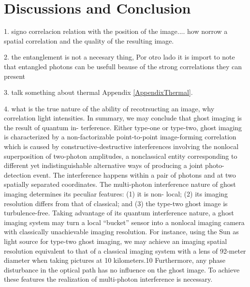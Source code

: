 
\chapter{Discussions and Conclusion} %

\label{Chapter5} %

1. signo correlacion relation with the position of the image.... how norrow a spatial correlation and the quality of the resulting image.

2. the entanglement is not a necesary thing, Por otro lado it is import to note 
that entangled photons can be usefull beause of the strong correlations they can present

3. talk something about thermal Appendix \ref{AppendixThermal}.

4. what is the true nature of the ability of recotrsucting an image, why correlation light intensities.\cite{zhong}
In summary, we may conclude that ghost imaging is the result of quantum in- terference. Either type-one or type-two, ghost imaging is characterized by a non-factorizable point-to-point image-forming correlation which is caused by constructive-destructive interferences involving the nonlocal superposition of two-photon amplitudes, a nonclassical entity corresponding to different yet indistinguishable alternative ways of producing a joint photo-detection event. The interference happens within a pair of photons and at two spatially separated coordinates. The multi-photon interference nature of ghost imaging determines its peculiar features: (1) it is non- local; (2) its imaging resolution differs from that of classical; and (3) the type-two ghost image is turbulence-free. Taking advantage of its quantum interference nature, a ghost imaging system may turn a local “bucket” sensor into a nonlocal imaging camera with classically unachievable imaging resolution. For instance, using the Sun as light source for type-two ghost imaging, we may achieve an imaging spatial resolution equivalent to that of a classical imaging system with a lens of 92-meter diameter when taking pictures at 10 kilometers.10 Furthermore, any phase disturbance in the optical path has no influence on the ghost image. To achieve these features the realization of multi-photon interference is necessary\cite{physicsGhost}.